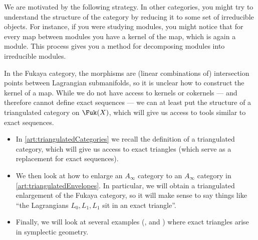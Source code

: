 \begin{exposition}
We are motivated by the following strategy.
In other categories, you might try to understand the structure of the category by reducing it to some set of irreducible objects. For instance, if you were studying modules, you might notice that for every map between modules you have a kernel of the map, which is again a module. This process gives you a method for decomposing modules into irreducible modules. 

In the Fukaya category, the morphisms are (linear combinations of) intersection points between Lagrangian submanifolds, so it is unclear how to construct the kernel of a map.
While we do not have access to kernels or cokernels --- and therefore cannot define exact sequences --- we can at least put the structure of a triangulated category on $\Fuk(X)$, which will give us access to tools similar to exact sequences. 

\begin{itemize}
    \item In \cref{art:triangulatedCategories} we recall the definition of a triangulated category, which will give us access to exact triangles (which serve as a replacement for exact sequences).
    \item We then look at how to enlarge an $A_\infty$ category to an $A_\infty$ category in \cref{art:triangulatedEnvelopes}. In particular, we will obtain a triangulated enlargement of the Fukaya category, so it will make sense to say things like ``the Lagrangians $L_0, L_1, L_1$ sit in an exact triangle''.
    \item Finally, we will look at several examples (, and ) where exact triangles arise in symplectic geometry.
\end{itemize}







    \end{exposition}